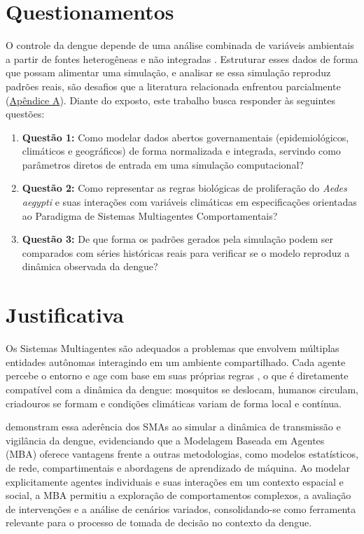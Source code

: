 \section{Questionamentos}
\label{1-questao}

O controle da dengue depende de uma análise combinada de variáveis ambientais a partir de fontes
heterogêneas e não integradas \cite{rizzi2016}. Estruturar esses dados de forma que
possam alimentar uma simulação, e analisar se essa simulação reproduz padrões reais,
são desafios que a literatura relacionada enfrentou parcialmente (\hyperref[ap-pesquisa-bibliografica]{Apêndice A}).
Diante do exposto, este trabalho busca responder às seguintes questões:

\begin{enumerate}
    \item \textbf{Questão 1:} Como modelar dados abertos governamentais (epidemiológicos,
climáticos e geográficos) de forma normalizada e integrada, servindo como
parâmetros diretos de entrada em uma simulação computacional?
    
    \item \textbf{Questão 2:} Como representar as regras biológicas de proliferação do \textit{Aedes aegypti}
e suas interações com variáveis climáticas em especificações orientadas ao Paradigma de Sistemas Multiagentes Comportamentais?
    
    \item \textbf{Questão 3:} De que forma os padrões gerados pela simulação podem ser comparados
com séries históricas reais para verificar se o modelo reproduz a dinâmica observada
da dengue?
\end{enumerate}

\section{Justificativa}
\label{1-justificativa}

Os Sistemas Multiagentes são adequados a problemas que envolvem múltiplas entidades
autônomas interagindo em um ambiente compartilhado. Cada agente percebe o
entorno e age com base em suas próprias regras \cite{wooldridge2009}, o que é diretamente
compatível com a dinâmica da dengue: mosquitos se deslocam, humanos circulam,
criadouros se formam e condições climáticas variam de forma local e contínua.

 demonstram essa aderência dos SMAs ao simular a dinâmica de
transmissão e vigilância da dengue, evidenciando que a Modelagem Baseada em Agentes
(MBA) oferece vantagens frente a outras metodologias, como modelos estatísticos, de
rede, compartimentais e abordagens de aprendizado de máquina. Ao modelar
explicitamente agentes individuais e suas interações em um contexto espacial e social,
a MBA permitiu a exploração de comportamentos complexos, a avaliação de intervenções
e a análise de cenários variados, consolidando-se como ferramenta relevante para o
processo de tomada de decisão no contexto da dengue.

